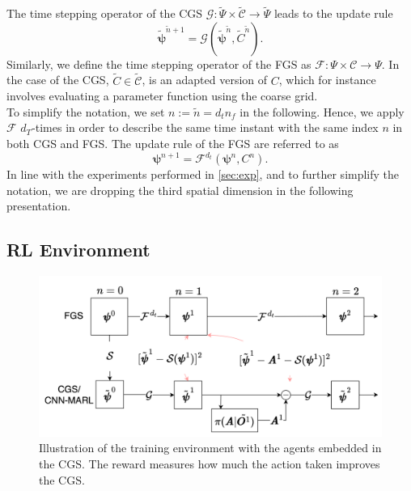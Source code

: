 \documentclass{article}
\theoremstyle{plain}
\theoremstyle{definition}
\theoremstyle{remark}
\begin{document}
The time stepping operator of the CGS $\mathcal G: \tilde \Psi \times \tilde{\mathcal C} \rightarrow \tilde \Psi $ leads to the update rule 
\begin{equation}
\label{eq:cg_dyn}
\tilde{\boldsymbol{\psi}}^{{\tilde{n}}+1} =\mathcal G(\tilde{\boldsymbol{\psi}}^{\tilde{n}}, \tilde C^{\tilde{n}}).
\end{equation}
Similarly, we define the time stepping operator of the FGS as $\mathcal F:  \Psi \times \mathcal C \rightarrow  \Psi $. In the case of the CGS,  $\tilde C \in \tilde{\mathcal{C}}$, is an adapted version of $C$, which for instance involves evaluating a parameter function using the coarse grid.\\
To simplify the notation, we set $n:={\tilde{n}}=d_t n_f$ in the following. Hence, we apply $\mathcal{F}$ $d_T$-times in order to describe the same time instant with the same index $n$ in both CGS and FGS. The update rule of the FGS are referred to as 
\begin{equation}
\boldsymbol{\psi}^{n+1} =\mathcal F^{d_t}(\boldsymbol{\psi}^n, C^n). 
\end{equation}
In line with the experiments performed in \cref{sec:exp}, and to further simplify the notation, we are dropping the third spatial dimension in the following presentation.

\subsection{RL Environment}
\label{sec:RL}
\begin{figure}[ht]
\vskip 0.2in
\begin{center}
\centerline{\includegraphics[width=\columnwidth]{illustrations/SMARL_final.drawio.png}}
\caption{Illustration of the training environment with the agents embedded in the CGS. The reward measures how much the action taken improves the CGS.}
\label{fig:environment}
\end{center}
\vskip -0.2in
\end{figure}
\end{document}
